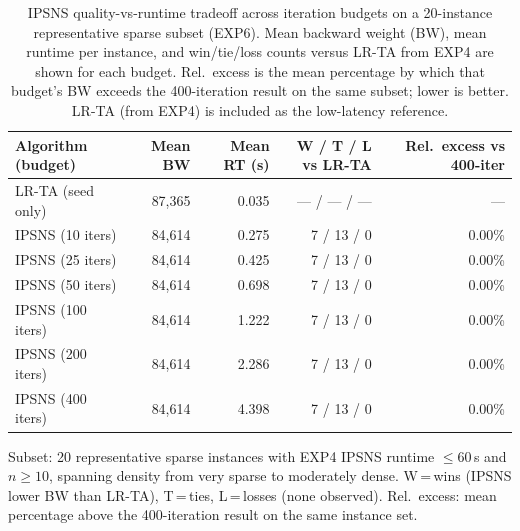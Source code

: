 \begin{table}[htbp]
\centering
\footnotesize
\caption{IPSNS quality-vs-runtime tradeoff across iteration budgets on a
20-instance representative sparse subset (EXP6).
Mean backward weight (BW), mean runtime per instance, and win/tie/loss counts
versus LR-TA from EXP4 are shown for each budget.
Rel.\ excess is the mean percentage by which that budget's BW exceeds the
400-iteration result on the same subset; lower is better.
LR-TA (from EXP4) is included as the low-latency reference.}
\label{tab:ipsns_budget_curve}
\begin{tabular}{@{}lrrrr@{}}
\toprule
Algorithm (budget) & Mean BW & Mean RT (s) & W / T / L vs LR-TA & Rel.\ excess vs 400-iter \\
\midrule
LR-TA (seed only) & 87,365 & 0.035 & --- / --- / --- & --- \\
IPSNS (10 iters) & 84,614 & 0.275 & 7 / 13 / 0 & 0.00\% \\
IPSNS (25 iters) & 84,614 & 0.425 & 7 / 13 / 0 & 0.00\% \\
IPSNS (50 iters) & 84,614 & 0.698 & 7 / 13 / 0 & 0.00\% \\
IPSNS (100 iters) & 84,614 & 1.222 & 7 / 13 / 0 & 0.00\% \\
IPSNS (200 iters) & 84,614 & 2.286 & 7 / 13 / 0 & 0.00\% \\
IPSNS (400 iters) & 84,614 & 4.398 & 7 / 13 / 0 & 0.00\% \\
\bottomrule
\end{tabular}
\vspace{3pt}
{\footnotesize
Subset: 20 representative sparse instances with EXP4 IPSNS runtime $\le 60$\,s
and $n \ge 10$, spanning density from very sparse to moderately dense.
W\,=\,wins (IPSNS lower BW than LR-TA), T\,=\,ties, L\,=\,losses (none observed).
Rel.\ excess: mean percentage above the 400-iteration result on the same instance set.}
\end{table}
